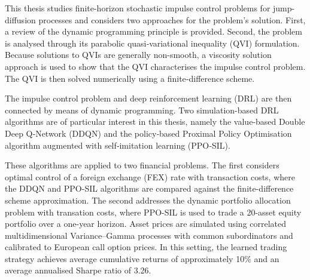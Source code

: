 This thesis studies finite-horizon stochastic impulse control problems for jump-diffusion processes and considers two approaches for the problem's solution. First, a review of the dynamic programming principle is provided. Second, the problem is analysed through its parabolic quasi‑variational inequality (QVI) formulation. Because solutions to QVIs are generally non-smooth, a viscosity solution approach is used to show that the QVI characterises the impulse control problem. The QVI is then solved numerically using a finite‑difference scheme.

The impulse control problem and deep reinforcement learning (DRL) are then connected by means of dynamic programming. Two simulation-based DRL algorithms are of particular interest in this thesis, namely the value‑based Double Deep Q‑Network (DDQN) and the policy‑based Proximal Policy Optimisation algorithm augmented with self‑imitation learning (PPO‑SIL).

These algorithms are applied to two financial problems. The first considers optimal control of a foreign exchange (FEX) rate with transaction costs, where the DDQN and PPO-SIL algorithms are compared against the finite-difference scheme approximation. The second addresses the dynamic portfolio allocation problem with transation costs, where PPO-SIL is used to trade a 20-asset equity portfolio over a one-year horizon. Asset prices are simulated using correlated multidimensional Variance–Gamma processes with common subordinators and calibrated to European call option prices. In this setting, the learned trading strategy achieves average cumulative returns of approximately 10\% and an average annualised Sharpe ratio of 3.26.